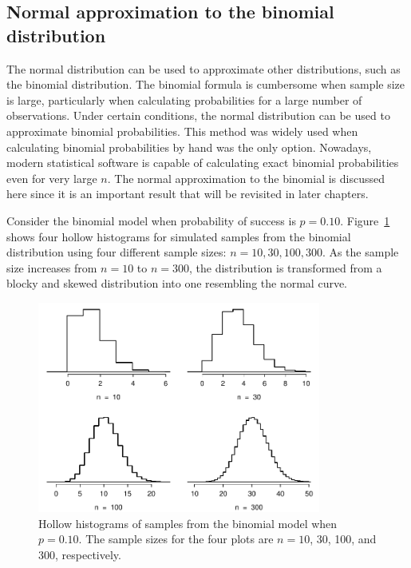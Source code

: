 \subsection{Normal approximation to the binomial distribution}
	

The normal distribution can be used to approximate other distributions, such as the binomial distribution. The binomial formula is cumbersome when sample size is large, particularly when calculating probabilities for a large number of observations. Under certain conditions, the normal distribution can be used to approximate binomial probabilities. This method was widely used when calculating binomial probabilities by hand was the only option. Nowadays, modern statistical software is capable of calculating exact binomial probabilities even for very large $n$. The normal approximation to the binomial is discussed here since it is an important result that will be revisited in later chapters.

Consider the binomial model when probability of success is $p=0.10$. Figure~\ref{fourBinomialModelsShowingApproxToNormal} shows four hollow histograms for simulated samples from the binomial distribution using four different sample sizes: $n=10, 30, 100, 300$. As the sample size increases from $n=10$ to $n=300$, the distribution is transformed from a blocky and skewed distribution into one resembling the normal curve.
	
\begin{figure}[h]
		\centering
		\includegraphics[width=0.83\textwidth]{ch_distributions_oi_biostat/figures/fourBinomialModelsShowingApproxToNormal/fourBinomialModelsShowingApproxToNormal}
		\caption{Hollow histograms of samples from the binomial model when $p=0.10$. The sample sizes for the four plots are $n=10$, 30, 100, and 300, respectively.}
		\label{fourBinomialModelsShowingApproxToNormal}
\end{figure}
	
